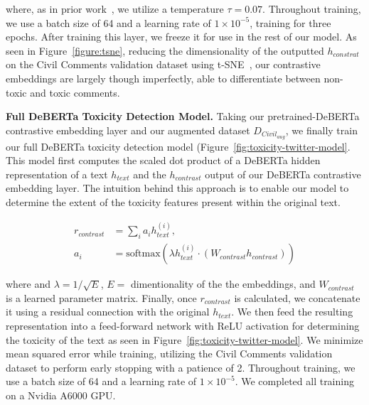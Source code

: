 \noindent
where, as in prior work~\cite{liang2022jointcl}, we utilize a temperature $\tau=0.07$. Throughout training, we use a batch size of 64 and a learning rate of $1\times 10^{-5}$, training for three epochs. After training this layer, we freeze it for use in the rest of our model. As seen in Figure~\ref{figure:tsne}, reducing the dimensionality of the outputted $h_{constrat}$ on the Civil Comments validation dataset using t-SNE~\cite{van2008visualizing}, our contrastive embeddings are largely though imperfectly, able to differentiate between non-toxic and toxic comments.

\vspace{2pt}\noindent
\noindent
\textbf{Full DeBERTa Toxicity Detection Model.} Taking our pretrained-DeBERTa contrastive embedding layer and our augmented dataset $D_{Civil_{aug}}$, we finally train our full DeBERTa toxicity detection model (Figure~\ref{fig:toxicity-twitter-model}. This model first computes the scaled dot product of a DeBERTa hidden representation of a text $h_{text}$ and the $h_{contrast}$ output of our DeBERTa contrastive embedding layer. The intuition behind this approach is to enable our model to determine the extent of the toxicity features present within the original text.  

\begin{align*}
r_{contrast} &= \sum_i a_ih_{text}^{(i)},\\
a_i &= \textrm{softmax} \left( \lambda h_{text}^{(i)} \cdot (W_{contrast} h_{contrast}) \right)
\end{align*}

\noindent
where and $\lambda = 1/\sqrt{E}$, $E=$ dimentionality of the the embeddings, and $W_{contrast}$ is a learned parameter matrix. Finally, once $r_{contrast}$ is calculated, we concatenate it using a residual connection with the original $h_{text}$. We then feed the resulting representation into a feed-forward network with ReLU activation for determining the toxicity of the text as seen in Figure~\ref{fig:toxicity-twitter-model}. We minimize mean squared error while training, utilizing the Civil Comments validation dataset to perform early stopping with a patience of 2. Throughout training, we use a batch size of 64 and a learning rate of $1\times 10^{-5}$. We completed all training on a Nvidia A6000 GPU\@. 

